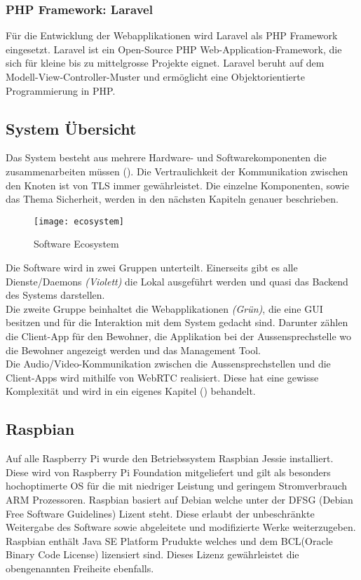 \subsubsection{PHP Framework: Laravel}
Für die Entwicklung der Webapplikationen wird Laravel als PHP Framework eingesetzt. Laravel ist ein Open-Source PHP Web-Application-Framework, die sich für kleine bis zu mittelgrosse Projekte eignet. Laravel beruht auf dem Modell-View-Controller-Muster und ermöglicht eine Objektorientierte Programmierung in PHP.

\subsection{System Übersicht}
Das System besteht aus mehrere Hardware- und Softwarekomponenten die zusammenarbeiten müssen (). Die  Vertraulichkeit der Kommunikation zwischen den Knoten ist von TLS immer gewährleistet. Die einzelne Komponenten, sowie das Thema Sicherheit, werden in den nächsten Kapiteln genauer beschrieben.

\begin{figure}[htb!]
	\begin{center}
		\texttt{[image: ecosystem]}
		\caption[Software Ecosystem]{Software Ecosystem}
		\label{fig:echosystem}
	\end{center}
\end{figure}

Die Software wird in zwei Gruppen unterteilt. Einerseits gibt es alle Dienste/Daemons \textit{(Violett)} die Lokal ausgeführt werden und quasi das Backend des Systems darstellen.
\\
Die zweite Gruppe beinhaltet die Webapplikationen \textit{(Grün)}, die eine GUI besitzen und für die Interaktion mit dem System gedacht sind. Darunter zählen die Client-App für den Bewohner, die Applikation bei der Aussensprechstelle wo die Bewohner angezeigt werden und das Management Tool.
\\
Die Audio/Video-Kommunikation zwischen die Aussensprechstellen und die Client-Apps wird mithilfe von WebRTC realisiert. Diese hat eine gewisse Komplexität und wird in ein eigenes Kapitel () behandelt.

\subsection{Raspbian}
\label{kap:raspbian}
Auf alle Raspberry Pi wurde den Betriebssystem Raspbian Jessie installiert. Diese wird von Raspberry Pi Foundation mitgeliefert und gilt als besonders hochoptimerte OS für die mit niedriger Leistung und geringem Stromverbrauch ARM Prozessoren.
Raspbian basiert auf Debian welche unter der DFSG (Debian Free Software Guidelines) Lizent steht. Diese erlaubt der unbeschränkte Weitergabe des Software sowie abgeleitete und modifizierte  Werke weiterzugeben. 
Raspbian enthält Java SE Platform Prudukte welches und dem BCL(Oracle Binary Code License) lizensiert sind. Dieses Lizenz gewährleistet die obengenannten Freiheite ebenfalls.

